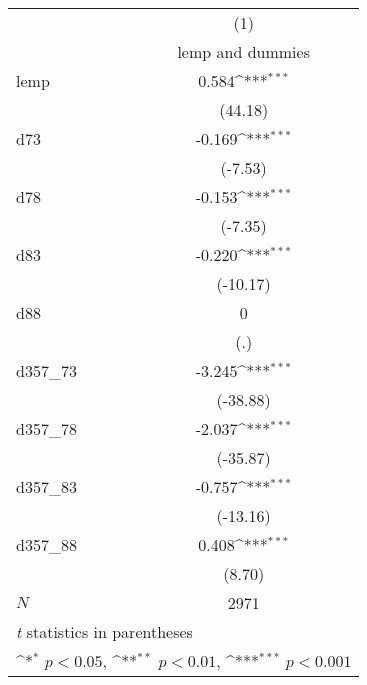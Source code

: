 {
\def\sym#1{\ifmmode^{#1}\else\(^{#1}\)\fi}
\begin{tabular}{l*{1}{c}}
\hline\hline
            &\multicolumn{1}{c}{(1)}\\
            &\multicolumn{1}{c}{lemp and dummies}\\
\hline
lemp        &       0.584\sym{***}\\
            &     (44.18)         \\
[1em]
d73         &      -0.169\sym{***}\\
            &     (-7.53)         \\
[1em]
d78         &      -0.153\sym{***}\\
            &     (-7.35)         \\
[1em]
d83         &      -0.220\sym{***}\\
            &    (-10.17)         \\
[1em]
d88         &           0         \\
            &         (.)         \\
[1em]
d357\_73     &      -3.245\sym{***}\\
            &    (-38.88)         \\
[1em]
d357\_78     &      -2.037\sym{***}\\
            &    (-35.87)         \\
[1em]
d357\_83     &      -0.757\sym{***}\\
            &    (-13.16)         \\
[1em]
d357\_88     &       0.408\sym{***}\\
            &      (8.70)         \\
\hline
\(N\)       &        2971         \\
\hline\hline
\multicolumn{2}{l}{\footnotesize \textit{t} statistics in parentheses}\\
\multicolumn{2}{l}{\footnotesize \sym{*} \(p<0.05\), \sym{**} \(p<0.01\), \sym{***} \(p<0.001\)}\\
\end{tabular}
}
